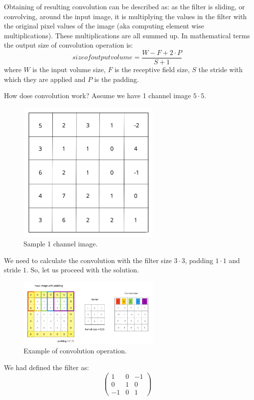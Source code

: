 Obtaining of resulting convolution can be described as: as the filter is sliding, or convolving, around the input image, it is multiplying the values in the filter with the original pixel values of the image (aka computing element wise multiplications). These multiplications are all summed up. In mathematical terms the output size of convolution operation is: \[size of output volume = \frac{W-F+2 \cdot P}{S+1} \] where $W$ is the input volume size, $F$ is the receptive field size, $S$ the stride with which they are applied and $P$ is the padding.

How dose convolution work? Assume we have 1 channel image $5 \cdot 5$.
\begin{figure}[h]
    \centering \includegraphics[width=7cm]{images/1_channel.jpg}
    \caption {Sample 1 channel image.}
\end{figure}

We need to calculate the convolution with the filter size $3 \cdot 3$, padding $1 \cdot 1$ and stride $1$. So, let us proceed with the solution. 
\begin{figure}[h]
    \centering \includegraphics[width=7cm]{images/convolution.jpg}
    \caption {Example of convolution operation.}
\end{figure}

We had defined the filter as: 
\[ \begin{pmatrix} 1 & 0 & -1 \\ 0 & 1 & 0 \\ -1 & 0 & 1 \end{pmatrix} \]


